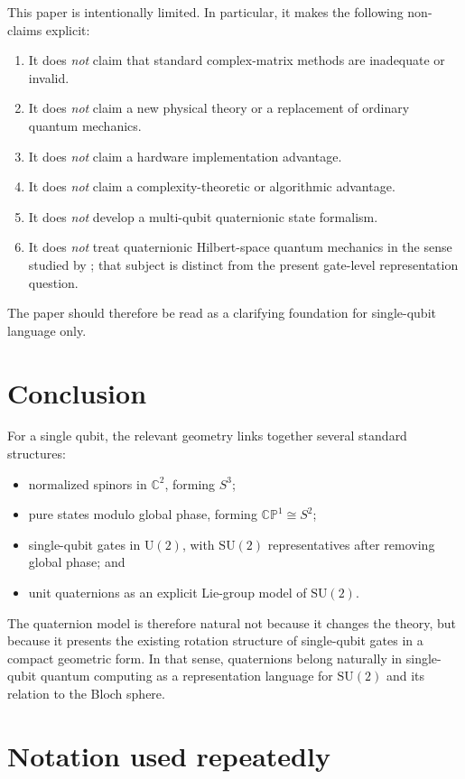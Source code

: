 \documentclass[11pt]{article}
\theoremstyle{remark}
\newcommand{\C}{\mathbb{C}}
\newcommand{\CP}{\mathbb{CP}}
\newcommand{\SU}{\mathrm{SU}}
\newcommand{\U}{\mathrm{U}}
\begin{document}
This paper is intentionally limited. In particular, it makes the following non-claims explicit:
\begin{enumerate}[label=(\arabic*)]
\item It does \emph{not} claim that standard complex-matrix methods are inadequate or invalid.
\item It does \emph{not} claim a new physical theory or a replacement of ordinary quantum mechanics.
\item It does \emph{not} claim a hardware implementation advantage.
\item It does \emph{not} claim a complexity-theoretic or algorithmic advantage.
\item It does \emph{not} develop a multi-qubit quaternionic state formalism.
\item It does \emph{not} treat quaternionic Hilbert-space quantum mechanics in the sense studied by \citet{adler1995}; that subject is distinct from the present gate-level representation question.
\end{enumerate}

The paper should therefore be read as a clarifying foundation for single-qubit language only.

\section{Conclusion}

For a single qubit, the relevant geometry links together several standard structures:
\begin{itemize}
\item normalized spinors in $\C^2$, forming $S^3$;
\item pure states modulo global phase, forming $\CP^1\cong S^2$;
\item single-qubit gates in $\U(2)$, with $\SU(2)$ representatives after removing global phase; and
\item unit quaternions as an explicit Lie-group model of $\SU(2)$.
\end{itemize}
The quaternion model is therefore natural not because it changes the theory, but because it presents the existing rotation structure of single-qubit gates in a compact geometric form. In that sense, quaternions belong naturally in single-qubit quantum computing as a representation language for $\SU(2)$ and its relation to the Bloch sphere.

\appendix

\section{Notation used repeatedly}
\end{document}
